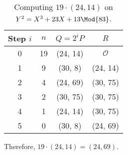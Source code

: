 \documentclass[
  coursecode={MTHE 418},
  assignmentname={Homework \homeworknumber},
  studentnumber=20053722,
  name={Bryan Hoang},
  draft,
]{
  ltxanswer%
}
\begin{document}
  \begin{questions}
    \setcounter{question}{\questionnumber}
    \addtocounter{question}{-1}
    \question[10]\
    \begin{parts}
      \part{}
      \begin{solution}
        \begin{table}
          \caption{Computing \(19 \cdot (24, 14)\) on \(Y^{2} = X^{3} + 23X + 13 \Mod{83}\).}
          \begin{tabular}{*{4}{c}}
            \toprule
            Step \(i\) & \(n\) & \(Q = 2^{i} P\) & \(R\)           \\
            \midrule
            0          & 19    & (24, 14)        & \(\mathcal{O}\) \\
            1          & 9     & (30, 8)         & (24, 14)        \\
            2          & 4     & (24, 69)        & (30, 75)        \\
            3          & 2     & (30, 75)        & (30, 75)        \\
            4          & 1     & (24, 14)        & (30, 75)        \\
            5          & 0     & (30, 8)         & (24, 69)        \\
            \bottomrule
          \end{tabular}
        \end{table}
        Therefore, \(\boxed{19 \cdot (24, 14) = (24, 69)}\).
      \end{solution}
    \end{parts}
  \end{questions}
\end{document}
